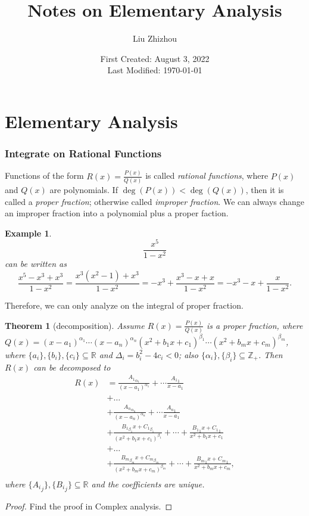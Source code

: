 \documentclass[12pt,a4paper]{article}
\title{Notes on Elementary Analysis}
\author{Liu Zhizhou}
\date{First Created: August 3, 2022\\
	Last Modified: \today}
\numberwithin{equation}{section}
\theoremstyle{mystyle}
\newtheorem{theorem}[definition]{Theorem}
\newtheorem{example}[definition]{Example}
\newcommand{\R}{\mathbb{R}}
\newcommand{\Z}{\mathbb{Z}}
\begin{document}
	{\sffamily \maketitle}
	
	
	\tableofcontents
	\part{Elementary Analysis}
	\section{Integrate on Rational Functions}
	Functions of the form $R(x)=\frac{P(x)}{Q(x)}$ is called \emph{rational functions}, where $P(x)$ and $Q(x)$ are polynomials. If $\deg(P(x))<\deg(Q(x))$, then it is called a \emph{proper fraction}; otherwise called \emph{improper fraction}. We can always change an improper fraction into a polynomial plus a proper faction.
	\begin{example}
		$$\frac{x^5}{1-x^2}$$ can be written as $$\frac{x^5-x^3+x^3}{1-x^2}=\frac{x^3(x^2-1)+x^3}{1-x^2}=-x^3+\frac{x^3-x+x}{1-x^2}=-x^3-x+\frac{x}{1-x^2}.$$
	\end{example}
	Therefore, we can only analyze on the integral of proper fraction.
	\begin{theorem}[decomposition]
		Assume $R(x)=\frac{P(x)}{Q(x)}$ is a proper fraction, where $Q(x)=(x-a_1)^{\alpha_1}\cdots (x-a_n)^{\alpha_n}(x^2+b_1 x+c_1)^{\beta_1}\cdots (x^2+b_m x+c_m)^{\beta_m}$, where $\{a_i\},\{b_i\},\{c_i\}\subseteq \R$ and $\Delta_i = b_i^2-4c_i<0$; also $\{\alpha_i\},\{\beta_i\}\subseteq \Z_+$. Then $R(x)$ can be decomposed to
		\begin{align*}
			R(x)  &=\frac{{A_1}_{\alpha_1}}{(x-a_1)^{\alpha_1}}+\cdots \frac{{A_1}_{1}}{x-a_1}\\
			&+\dots\\
			&+\frac{{A_n}_{\alpha_n}}{(x-a_n)^{\alpha_n}}+\cdots \frac{{A_n}_{1}}{x-a_1}\\
			&+\frac{{B_1}_{\beta_1}x+{C_1}_{\beta_1}}{(x^2+b_1 x+c_1)^{\beta_1}} + \cdots + \frac{{B_1}_{1}x+{C_1}_{1}}{x^2+b_1 x+c_1}\\
			&+\dots\\
			&+\frac{{B_m}_{\beta_m}x+{C_m}_{\beta_m}}{(x^2+b_m x+c_m)^{\beta_m}}+ \cdots + \frac{{B_m}_{1}x+{C_m}_{1}}{x^2+b_m x+c_m},\\
		\end{align*}
		where $\{{A_i}_j\}, \{{B_i}_j\} \subseteq \R$ and the coefficients are unique. 
	\end{theorem}
	\begin{proof}
		Find the proof in Complex analysis.
	\end{proof}
	
\end{document}
